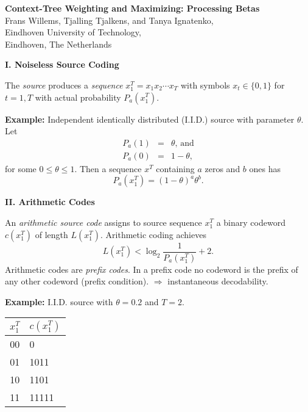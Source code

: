 \documentclass[a4paper,landscape]{slides} %
\newcommand{\xT}{x_{1}^{T}}
\begin{document}
\begin{slide}
\begin{center}
{\bf\Large Context-Tree Weighting and Maximizing: Processing Betas}
\\
\vspace{10mm}
{Frans Willems, Tjalling Tjalkens, and Tanya Ignatenko,\\
Eindhoven University of Technology,\\
 Eindhoven, The Netherlands}
\end{center}
\end{slide}
\begin{slide}{\bf\Large\color{blue} I. Noiseless Source Coding}

The {\em source} produces a {\em sequence} $\xT=x_{1}x_{2}\cdots x_{T}$ with symbols $x_t \in \{0,1\}$ for $t=1,T$ with actual probability $P_{a}(\xT)$.

\begin{center}

\end{center}

{\bf Example:} Independent identically distributed (I.I.D.) source
with parameter $\theta$.
Let
\begin{eqnarray}
P_{a}(1) &=& \theta \text{, and}\nonumber \\
P_{a}(0) &=& 1-\theta, \nonumber
\end{eqnarray}
for some $0 \leq \theta \leq 1$.
Then a sequence $x^{T}$ containing $a$ zeros and $b$ ones has
\[
P_{a}(\xT) = (1-\theta)^{a}\theta^{b}.
\]
\end{slide}
\begin{slide}{\bf\Large\color{blue} II. Arithmetic Codes}

An {\em arithmetic source code} assigns to source sequence $\xT$ a binary codeword
$c(\xT)$ of length $L(\xT)$.
Arithmetic coding achieves
\[
L(\xT) <  \log_{2}\frac{1}{P_{a}(\xT)}  + 2.
\]
Arithmetic codes are {\em prefix codes}.
In a prefix code no codeword is the prefix of any other codeword (prefix condition).
$\Rightarrow$ instantaneous decodability.

{\bf Example:} I.I.D. source with $\theta = 0.2$ and $T=2$.
\begin{center}
\begin{tabular}{c | l  }
$\xT$ & $c(\xT)$  \\
\hline
00 & 0      \\
01 & 1011   \\
10 & 1101   \\
11 & 11111
\end{tabular}
\end{center}
\end{slide}
\end{document}

